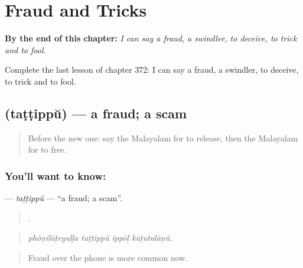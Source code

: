 
\chapter{Fraud and Tricks}
\label{ch:ml-fraud-and-tricks}

\begin{chapteropening}
\textbf{By the end of this chapter:} \emph{I can say a fraud, a swindler, to deceive, to trick and to fool.}

Complete the last lesson of chapter 372: I can say a fraud, a swindler, to deceive, to trick and to fool.
\end{chapteropening}

\section[\texorpdfstring{\ml{തട്ടിപ്പ്} (taṭṭippŭ)}{തട്ടിപ്പ് (taṭṭippŭ)}]{ (taṭṭippŭ) — a fraud; a scam}

\label{lesson:ML-C372-tattippu}



\begin{quote}
Before the new one: say the Malayalam for to release, then the Malayalam for to free.
\end{quote}

\subsection*{You'll want to know: }
\textbf{} — \emph{taṭṭippŭ} — \textquotedblleft{}a fraud; a scam\textquotedblright{}.

\begin{quote}
   .
\end{quote}

\begin{quote}
\emph{phōṇilūṭeyuḷḷa taṭṭippŭ ippōḷ kūṭutalāṇŭ.}
\end{quote}

\begin{quote}
Fraud over the phone is more common now.
\end{quote}

